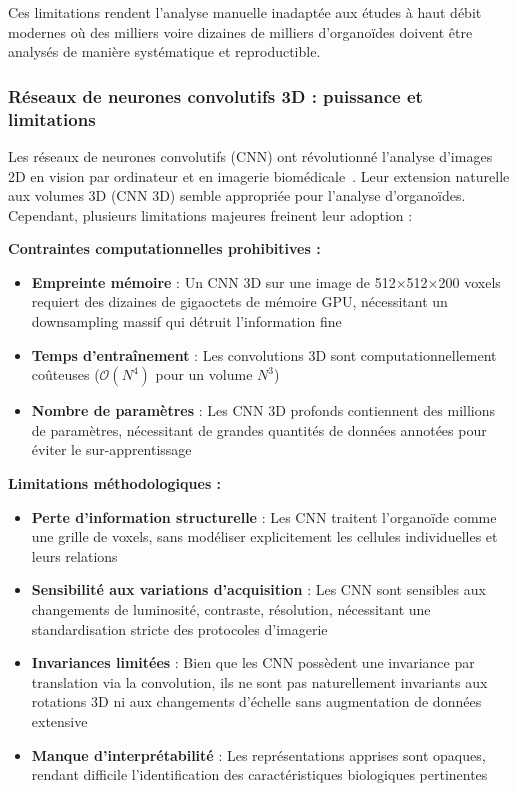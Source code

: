 Ces limitations rendent l'analyse manuelle inadaptée aux études à haut débit modernes où des milliers voire dizaines de milliers d'organoïdes doivent être analysés de manière systématique et reproductible.

\subsubsection{Réseaux de neurones convolutifs 3D : puissance et limitations}

Les réseaux de neurones convolutifs (CNN) ont révolutionné l'analyse d'images 2D en vision par ordinateur et en imagerie biomédicale~\cite{LeCun2015,Krizhevsky2012}. Leur extension naturelle aux volumes 3D (CNN 3D) semble appropriée pour l'analyse d'organoïdes. Cependant, plusieurs limitations majeures freinent leur adoption :

\textbf{Contraintes computationnelles prohibitives :}
\begin{itemize}
    \item \textbf{Empreinte mémoire} : Un CNN 3D sur une image de 512×512×200 voxels requiert des dizaines de gigaoctets de mémoire GPU, nécessitant un downsampling massif qui détruit l'information fine
    \item \textbf{Temps d'entraînement} : Les convolutions 3D sont computationnellement coûteuses ($\mathcal{O}(N^4)$ pour un volume $N^3$)
    \item \textbf{Nombre de paramètres} : Les CNN 3D profonds contiennent des millions de paramètres, nécessitant de grandes quantités de données annotées pour éviter le sur-apprentissage
\end{itemize}

\textbf{Limitations méthodologiques :}
\begin{itemize}
    \item \textbf{Perte d'information structurelle} : Les CNN traitent l'organoïde comme une grille de voxels, sans modéliser explicitement les cellules individuelles et leurs relations
    \item \textbf{Sensibilité aux variations d'acquisition} : Les CNN sont sensibles aux changements de luminosité, contraste, résolution, nécessitant une standardisation stricte des protocoles d'imagerie
    \item \textbf{Invariances limitées} : Bien que les CNN possèdent une invariance par translation via la convolution, ils ne sont pas naturellement invariants aux rotations 3D ni aux changements d'échelle sans augmentation de données extensive
    \item \textbf{Manque d'interprétabilité} : Les représentations apprises sont opaques, rendant difficile l'identification des caractéristiques biologiques pertinentes
\end{itemize}


